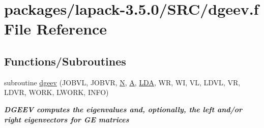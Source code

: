 \hypertarget{dgeev_8f}{}\section{packages/lapack-\/3.5.0/\+S\+R\+C/dgeev.f File Reference}
\label{dgeev_8f}
\subsection*{Functions/\+Subroutines}
\begin{DoxyCompactItemize}
\item 
subroutine \hyperlink{group__doubleGEeigen_ga66e19253344358f5dee1e60502b9e96f}{dgeev} (J\+O\+B\+V\+L, J\+O\+B\+V\+R, \hyperlink{polmisc_8c_a0240ac851181b84ac374872dc5434ee4}{N}, \hyperlink{classA}{A}, \hyperlink{example__user_8c_ae946da542ce0db94dced19b2ecefd1aa}{L\+D\+A}, W\+R, W\+I, V\+L, L\+D\+V\+L, V\+R, L\+D\+V\+R, W\+O\+R\+K, L\+W\+O\+R\+K, I\+N\+F\+O)
\begin{DoxyCompactList}\small\item\em {\bfseries  D\+G\+E\+E\+V computes the eigenvalues and, optionally, the left and/or right eigenvectors for G\+E matrices} \end{DoxyCompactList}\end{DoxyCompactItemize}
